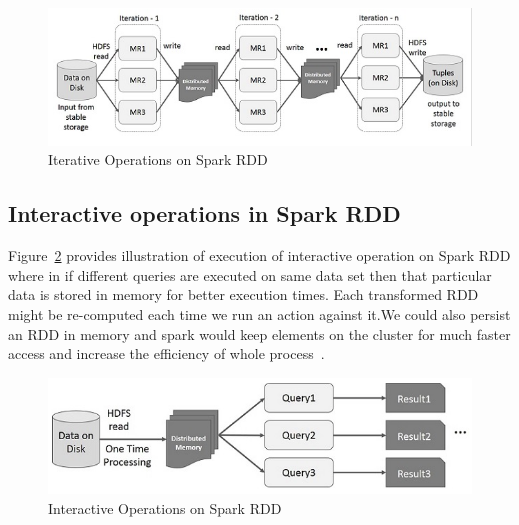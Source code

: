 \begin{figure}[!ht]
  \centering\includegraphics[width=\columnwidth]{images/iterativeSpark.png}
   \caption{Iterative Operations on Spark RDD
   ~\cite{hid-sp18-410-spark-RDD}}\label{fig:iterative-spark}
\end{figure}



\subsection{Interactive operations in Spark RDD}

Figure~\ref{fig:interactive-spark} provides illustration of execution of 
interactive operation on Spark RDD where in if different queries are executed on
 same data set then that particular data is stored in memory for better 
 execution times. Each transformed RDD might be re-computed each time we run an 
 action against it.We could also persist an RDD in memory and spark would keep 
 elements on the cluster for much faster access and increase the efficiency of 
 whole process~\cite{hid-sp18-410-spark-RDD}.





\begin{figure}[!ht]
  \centering\includegraphics[width=\columnwidth]{images/interactiveSpark.png}
   \caption{Interactive Operations on Spark RDD
   ~\cite{hid-sp18-410-spark-RDD}}\label{fig:interactive-spark}
\end{figure}



